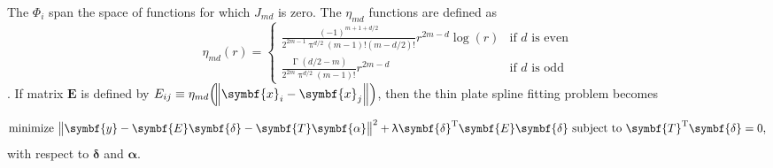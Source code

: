 The \(\Phi_i\) span the space of functions for which \(J_{md}\) is zero.  The \(\eta_{md}\) functions are defined as
\begin{equation}
  \label{eq:ThinPlateSplinesEtaFunctionDefinition}
  \eta_{md}(r) =
  \begin{cases}
    \frac{(-1)^{m + 1 + d / 2}}{2^{2m - 1}\uppi^{d / 2}(m - 1)!(m - d / 2)!}r^{2m - d}\log(r) & \text{if \(d\) is even} \\
    \frac{\upGamma (d / 2 - m)}{2^{2m}\uppi^{d / 2}(m - 1)!}r^{2m - d} & \text{if \(d\) is odd}
  \end{cases}
\end{equation}
\parencite{Wood2006}.  If matrix \(\symbf{E}\) is defined by \(E_{ij} \equiv \eta_{md}\Bigl(\norm{\symbf{x}_i - \symbf{x}_j}\Bigr)\), then the thin plate spline fitting problem becomes

\begin{equation}
  \label{eq:ThinPlateSplineSimplifiedFittingProblem}
  \text{minimize } \norm{\symbf{y} - \symbf{E}\symbf{\delta} - \symbf{T}\symbf{\alpha}}^2 + \uplambda \symbf{\delta}^{\text{T}}\symbf{E}\symbf{\delta} \text{ subject to } \symbf{T}^{\text{T}}\symbf{\delta} = 0,
\end{equation}
with respect to \(\symbf{\delta}\) and \(\symbf{\alpha}\).

